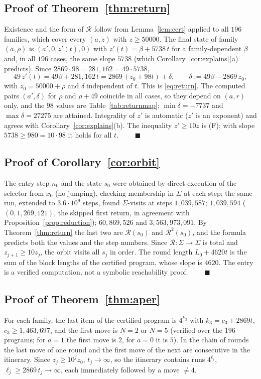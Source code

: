 \documentclass[11pt,a4paper]{article}
\theoremstyle{definition}
\newcommand{\Sig}{\Sigma}
\newcommand{\Ret}{\mathcal{R}}
\begin{document}
\subsection{Proof of Theorem~\ref{thm:return}}
Existence and the form of $\Ret$ follow from Lemma~\ref{lem:cert} applied to all $196$ families, which cover every $(a,z)$ with $z\ge50000$. The final state of family $(a,\rho)$ is $(a',0,z'(t),0)$ with $z'(t)=\beta+5738\,t$ for a family-dependent $\beta$ and, in all $196$ cases, the same slope $5738$ (which Corollary~\ref{cor:explains}(a) predicts). Since $2869\cdot98=281{,}162=49\cdot5738$,
\[
49\,z'(t)=49\beta+281{,}162\,t=2869\,(z_0+98t)+\delta,\qquad \delta:=49\beta-2869\,z_0,
\]
with $z_0=50000+\rho$ and $\delta$ independent of $t$. This is \eqref{eq:return}. The computed pairs $(a',\delta)$ for $\rho$ and $\rho+49$ coincide in all cases, so they depend on $(a,r)$ only, and the $98$ values are Table~\ref{tab:returnmap}; $\min\delta=-7737$ and $\max\delta=27275$ are attained. Integrality of $z'$ is automatic ($z'$ is an exponent) and agrees with Corollary~\ref{cor:explains}(b). The inequality $z'\ge10z$ is (F); with slope $5738\ge980=10\cdot98$ it holds for all $t$. $\qquad\blacksquare$

\subsection{Proof of Corollary~\ref{cor:orbit}}
The entry step $n_0$ and the state $s_0$ were obtained by direct execution of the selector from $x_0$ (no jumping), checking membership in $\Sig$ at each step; the same run, extended to $3.6\cdot10^9$ steps, found $\Sig$-visits at steps $1{,}039{,}587$; $1{,}039{,}594$ ($(0,1{,}269{,}121)$, the skipped first return, in agreement with Proposition~\ref{prop:reduction}); $60{,}869{,}526$ and $3{,}563{,}973{,}091$. By Theorem~\ref{thm:return} the last two are $\Ret(s_0)$ and $\Ret^2(s_0)$, and the formula predicts both the values and the step numbers. Since $\Ret:\Sig\to\Sig$ is total and $z_{j+1}\ge10z_j$, the orbit visits all $s_j$ in order. The round length $L_0+4620t$ is the sum of the block lengths of the certified program, whose slope is $4620$. The entry is a verified computation, not a symbolic reachability proof. $\qquad\blacksquare$

\subsection{Proof of Theorem~\ref{thm:aper}}\label{sec:aper}
For each family, the last item of the certified program is $4^{k_3}$ with $k_3=c_3+2869t$, $c_3\ge1{,}463{,}697$, and the first move is $N=2$ or $N=5$ (verified over the $196$ programs; for $a=1$ the first move is $2$, for $a=0$ it is $5$). In the chain of rounds the last move of one round and the first move of the next are consecutive in the itinerary. Since $z_j\ge 10^jz_0$, $t_j\to\infty$, so the itinerary contains runs $4^{\ell_j}$, $\ell_j\ge 2869\,t_j\to\infty$, each immediately followed by a move $\ne4$.
\end{document}
